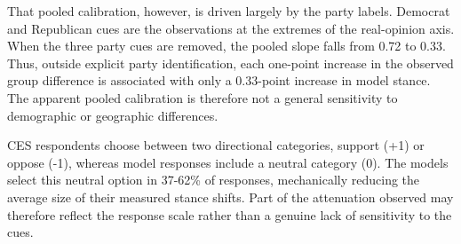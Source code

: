 That pooled calibration, however, is driven largely by the party labels.
Democrat and Republican cues are the observations at the extremes of the
real-opinion axis. When the three party cues are removed, the pooled slope falls
from 0.72 to 0.33. Thus, outside explicit party identification, each one-point
increase in the observed group difference is associated with only a 0.33-point
increase in model stance. The apparent pooled calibration is therefore not a
general sensitivity to demographic or geographic differences.




CES respondents choose between two directional categories, support (+1) or oppose (-1), whereas model responses include a neutral category (0). The models select this neutral option in 37-62\% of responses, mechanically reducing the average size of their measured stance shifts. Part of the attenuation observed may therefore reflect the response scale rather than a genuine lack of sensitivity to the cues.

